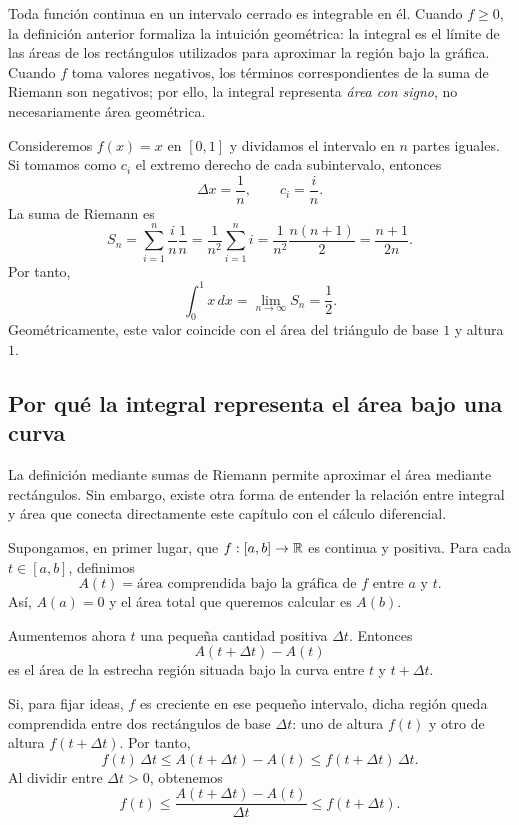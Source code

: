 Toda función continua en un intervalo cerrado es integrable en él. Cuando $f\geq0$, la definición anterior formaliza la intuición geométrica: la integral es el límite de las áreas de los rectángulos utilizados para aproximar la región bajo la gráfica. Cuando $f$ toma valores negativos, los términos correspondientes de la suma de Riemann son negativos; por ello, la integral representa \emph{área con signo}, no necesariamente área geométrica.

\begin{example}
Consideremos $f(x)=x$ en $[0,1]$ y dividamos el intervalo en $n$ partes iguales. Si tomamos como $c_i$ el extremo derecho de cada subintervalo, entonces
\[
\Delta x=\frac1n,
\qquad
c_i=\frac{i}{n}.
\]
La suma de Riemann es
\[
S_n=\sum_{i=1}^{n}\frac{i}{n}\frac1n
=\frac{1}{n^2}\sum_{i=1}^{n}i
=\frac{1}{n^2}\frac{n(n+1)}{2}
=\frac{n+1}{2n}.
\]
Por tanto,
\[
\int_0^1 x\,dx
=\lim_{n\to\infty}S_n
=\frac12.
\]
Geométricamente, este valor coincide con el área del triángulo de base $1$ y altura $1$.
\end{example}

\subsection{Por qué la integral representa el área bajo una curva}

La definición mediante sumas de Riemann permite aproximar el área mediante rectángulos. Sin embargo, existe otra forma de entender la relación entre integral y área que conecta directamente este capítulo con el cálculo diferencial.

Supongamos, en primer lugar, que $f:[a,b]\to\mathbb{R}$ es continua y positiva. Para cada $t\in[a,b]$, definimos
\[
A(t)=\text{área comprendida bajo la gráfica de $f$ entre $a$ y $t$}.
\]
Así, $A(a)=0$ y el área total que queremos calcular es $A(b)$.


Aumentemos ahora $t$ una pequeña cantidad positiva $\Delta t$. Entonces
\[
A(t+\Delta t)-A(t)
\]
es el área de la estrecha región situada bajo la curva entre $t$ y $t+\Delta t$.

Si, para fijar ideas, $f$ es creciente en ese pequeño intervalo, dicha región queda comprendida entre dos rectángulos de base $\Delta t$: uno de altura $f(t)$ y otro de altura $f(t+\Delta t)$. Por tanto,
\[
f(t)\,\Delta t
\leq
A(t+\Delta t)-A(t)
\leq
f(t+\Delta t)\,\Delta t.
\]
Al dividir entre $\Delta t>0$, obtenemos
\[
f(t)
\leq
\frac{A(t+\Delta t)-A(t)}{\Delta t}
\leq
f(t+\Delta t).
\]


